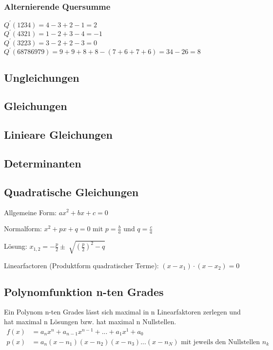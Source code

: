 \subsubsection{Alternierende Quersumme}

$Q^{\prime}(1234)=4-3+2-1=2$\\
$Q^{\prime}(4321)=1-2+3-4=-1$\\
$Q^{\prime}(3223)=3-2+2-3=0$\\
$Q^{\prime}(68786979)=9+9+8+8-(7+6+7+6)=34-26=8$





\subsection{Ungleichungen}
\subsection{Gleichungen}
\subsection{Linieare Gleichungen}
\subsection{Determinanten}
\subsection{Quadratische Gleichungen}
Allgemeine Form:
$ ax^2 + bx + c = 0 $

Normalform:
$ x^2 + px + q = 0 $ mit $p=\frac{b}{a}$ und $q=\frac{c}{a}$

Lösung: $x_{1,2}= - \frac{p}{2} \pm \sqrt[]{( \frac{p}{2})^2 -q }$

Linearfactoren (Produktform quadratischer Terme): $(x-x_1)\cdot (x-x_2 )=0$

\subsection{Polynomfunktion n-ten Grades}
Ein Polynom n-ten Grades lässt sich maximal in n Linearfaktoren zerlegen und hat maximal n Lösungen bzw. hat maximal n Nullstellen.
\begin{align*}
f(x) &= a_nx^n+a_{n-1}x^{n-1}+...+a_1x^1+a_0 \\
p(x) &=a_n(x-n_1)(x-n_2)(x-n_3)...(x-n_N) \textrm{ mit jeweils den Nullstellen } n_k
\end{align*}
